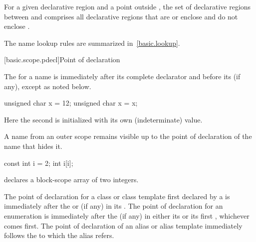 \pnum
For a given declarative region 
and a point  outside ,
the set of  declarative regions
between  and 
comprises all declarative regions
that are or enclose  and do not enclose .

\pnum
\begin{note}
The name lookup rules are summarized in~\ref{basic.lookup}.
\end{note}

[basic.scope.pdecl]{Point of declaration}

%

\pnum
{}%
%
The  for a name is immediately after its
complete declarator and before its
 (if any), except as noted below.
\begin{example}
\begin{codeblock}
unsigned char x = 12;
{ unsigned char x = x; }
\end{codeblock}
Here the second  is initialized with its own (indeterminate)
value.
\end{example}

\pnum
\begin{note}
%
A name from an outer scope remains visible up
to the point of declaration of the name that hides it.
\begin{example}
\begin{codeblock}
const int  i = 2;
{ int  i[i]; }
\end{codeblock}
declares a block-scope array of two integers.
\end{example}
\end{note}

\pnum
The point of declaration for a class or class template first declared by a
 is immediately after the  or
 (if any) in its .
The point of declaration for an enumeration is
immediately after the  (if any) in either its
 or its first
, whichever comes first.
The point of declaration of an alias or alias template immediately
follows the  to which the
alias refers.

